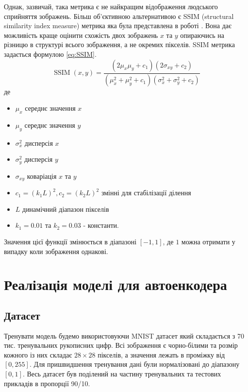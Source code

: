 \documentclass[14pt,a4paper]{extarticle}
\newcounter{e}
\numberwithin{equation}{section}
\numberwithin{figure}{section}
\begin{document}
	Однак, зазвичай, така метрика є не найкращим відображення людського сприйняття зображень. Більш об'єктивною альтернативою є SSIM (structural similarity index measure) метрика яка була представлена в роботі \cite{1284395}. Вона дає можливість краще оцінити схожість двох зображень $x$ та $y$ опираючись на різницю в структурі всього зображення, а не окремих пікселів. SSIM метрика задається формулою \ref{eq:SSIM}.
	\begin{equation}
		\label{eq:SSIM}
		\operatorname{SSIM}(x, y)=\frac{\left(2 \mu_{x} \mu_{y}+c_{1}\right)\left(2 \sigma_{x 	y}+c_{2}\right)}{\left(\mu_{x}^{2}+\mu_{y}^{2}+c_{1}\right)\left(\sigma_{x}^{2}+\sigma_{y}^{2}+c_{2}\right)}
	\end{equation}
	де
	\begin{itemize}
		\item $\mu_{x}$ середнє значення $x$
		\item $\mu_{y}$ середнє значення $y$
		\item $\sigma_{x}^{2}$ дисперсія $x$
		\item $\sigma_{y}^{2}$ дисперсія  $y$
		\item $\sigma_{x y}$ коваріація $x$ та $y$
		\item $c_{1}=\left(k_{1} L\right)^{2}, c_{2}=\left(k_{2} L\right)^{2}$ змінні для стабілізації ділення
		\item $L$ динамічний діапазон пікселів
		\item $k_{1}=0.01$ та $k_{2}=0.03$ - константи.	
	\end{itemize}
	
	Значення цієї функції змінюється в діапазоні $[-1, 1]$, де $1$ можна отримати у випадку коли зображення однакові.
	
	\newpage
	\thispagestyle{empty}
	\section{Реалізація моделі для автоенкодера}
	
	\subsection{Датасет}
	
	Тренувати модель будемо використовуючи MNIST датасет який складається з 70 тис. тренувальних рукописних цифр. Всі зображення є чорно-білими та розмір кожного із них складає $28 \times 28$ пікселів, а значення лежать в проміжку від $[0,255]$. Для пришвидшення тренування дані  були нормалізовані до діапазону $[0, 1]$. Весь датасет був поділений на частину тренувальних та тестових прикладів в пропорції 90/10.
	
\end{document}
